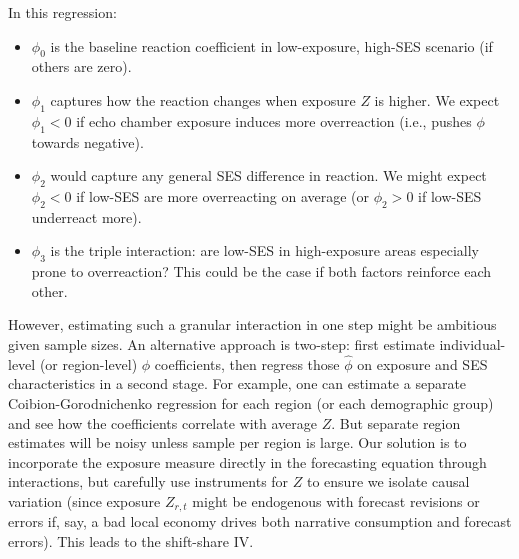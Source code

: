 \documentclass[12pt]{article}
\begin{document}
In this regression:
\begin{itemize}
    \item $\phi_0$ is the baseline reaction coefficient in low-exposure, high-SES scenario (if others are zero).
    \item $\phi_1$ captures how the reaction changes when exposure $Z$ is higher. We expect $\phi_1 < 0$ if echo chamber exposure induces more overreaction (i.e., pushes $\phi$ towards negative).
    \item $\phi_2$ would capture any general SES difference in reaction. We might expect $\phi_2 < 0$ if low-SES are more overreacting on average (or $\phi_2 > 0$ if low-SES underreact more).
    \item $\phi_3$ is the triple interaction: are low-SES in high-exposure areas especially prone to overreaction? This could be the case if both factors reinforce each other.
\end{itemize}
However, estimating such a granular interaction in one step might be ambitious given sample sizes. An alternative approach is two-step: first estimate individual-level (or region-level) $\phi$ coefficients, then regress those $\hat{\phi}$ on exposure and SES characteristics in a second stage. For example, one can estimate a separate Coibion-Gorodnichenko regression for each region (or each demographic group) and see how the coefficients correlate with average $Z$. But separate region estimates will be noisy unless sample per region is large.
Our solution is to incorporate the exposure measure directly in the forecasting equation through interactions, but carefully use instruments for $Z$ to ensure we isolate causal variation (since exposure $Z_{r,t}$ might be endogenous with forecast revisions or errors if, say, a bad local economy drives both narrative consumption and forecast errors). This leads to the shift-share IV.
\end{document}
